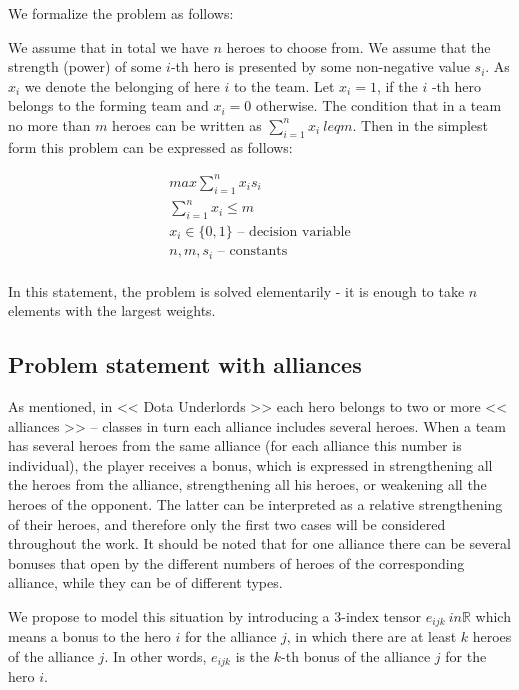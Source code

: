 \documentclass{article}
\begin{document}
We formalize the problem as follows:

We assume that in total we have $n$ heroes to choose from. We assume that the strength (power) of some $i$-th hero is presented by some non-negative value $s_i$. As $x_i$ we denote the  belonging of here $i$ to the team. Let $ x_i = 1 $, if the $ i $ -th hero belongs to the forming team and $ x_i = 0 $ otherwise. The condition that in a team no more than $m$  heroes can be written as $ \sum_{i=1}^n x_i \ leq m $. Then in the simplest form this problem can be expressed as follows:

\begin{equation}
\begin{gathered}
    max \sum_{i=1}^n x_i s_i \\
    \sum_{i=1}^n x_i \leq m \\
    x_i \in \{0, 1\} \text{ – decision variable} \\
   n, m, s_i \text{ – constants}  \\
\end{gathered}
\end{equation}


In this statement, the problem is solved elementarily - it is enough to take $ n $ elements with the largest weights.

\subsection{Problem statement with alliances}
As mentioned, in << Dota Underlords >> each hero belongs to two or more << alliances >> -- classes in turn each alliance includes several heroes. When a team has several heroes from the same alliance (for each alliance this number is individual), the player receives a bonus, which is expressed in strengthening all the heroes from the alliance, strengthening all his heroes, or weakening all the heroes of the opponent. The latter can be interpreted as a relative strengthening of their heroes, and therefore only the first two cases will be considered throughout the work. It should be noted that for one alliance there can be several bonuses that open by the different numbers of heroes of the corresponding alliance, while they can be of different types.

We propose to model this situation by introducing a 3-index tensor $ e_ {ijk} \ in \mathbb {R} $ which means a bonus to the hero $i$ for the alliance $ j $, in which there are at least $k$ heroes of the alliance $ j $. In other words, $ e_{ijk} $ is the $k$-th bonus of the alliance $ j$ for the hero $i$.
\end{document}
